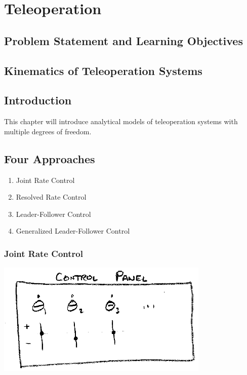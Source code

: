 %

\chapter{Teleoperation}

\section{Problem Statement and Learning Objectives}



%
%
%
%



\section*{Kinematics of Teleoperation Systems}

\section{Introduction}
This chapter will introduce analytical models of teleoperation systems with multiple degrees of freedom.



\section{Four Approaches}
\begin{enumerate}
	\item Joint Rate Control
	\item Resolved Rate Control
	\item Leader-Follower Control
	\item Generalized Leader-Follower Control
\end{enumerate}


\subsection{Joint Rate Control}

\includegraphics[width=4.0in]{figs14/00398.eps}

